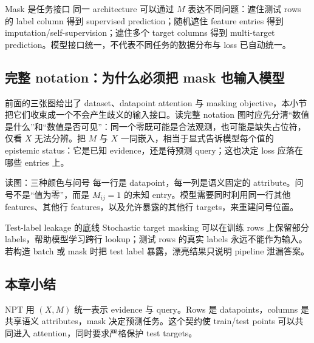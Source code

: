 \begin{importantbox}{Mask 是任务接口}
同一 architecture 可以通过 $M$ 表达不同问题：遮住测试 rows 的 label column 得到 supervised prediction；随机遮住 feature entries 得到 imputation/self-supervision；遮住多个 target columns 得到 multi-target prediction。模型接口统一，不代表不同任务的数据分布与 loss 已自动统一。
\end{importantbox}

\subsection{完整 notation：为什么必须把 mask 也输入模型}

前面的三张图给出了 dataset、datapoint attention 与 masking objective，本小节把它们收束成一个不会产生歧义的输入接口。读完整 notation 图时应先分清“数值是什么”和“数值是否可见”：同一个零既可能是合法观测，也可能是缺失占位符，仅看 $X$ 无法分辨。把 $M$ 与 $X$ 一同嵌入，相当于显式告诉模型每个值的 epistemic status：它是已知 evidence，还是待预测 query；这也决定 loss 应落在哪些 entries 上。


\begin{knowledgebox}{读图：三种颜色与问号}
每一行是 datapoint，每一列是语义固定的 attribute。问号不是“值为零”，而是 $M_{ij}=1$ 的未知 entry。模型需要同时利用同一行其他 features、其他行 features，以及允许暴露的其他行 targets，来重建问号位置。
\end{knowledgebox}

\begin{warningbox}{Test-label leakage 的底线}
Stochastic target masking 可以在训练 rows 上保留部分 labels，帮助模型学习跨行 lookup；测试 rows 的真实 labels 永远不能作为输入。若构造 batch 或 mask 时把 test label 暴露，漂亮结果只说明 pipeline 泄漏答案。
\end{warningbox}


\subsection{本章小结}

NPT 用 $(X,M)$ 统一表示 evidence 与 query。Rows 是 datapoints，columns 是共享语义 attributes，mask 决定预测任务。这个契约使 train/test points 可以共同进入 attention，同时要求严格保护 test targets。

